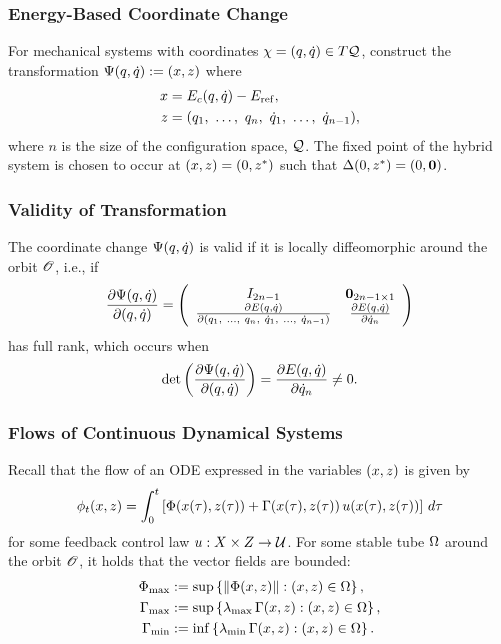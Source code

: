 \begin{frame}
  \frametitle{Energy-Based Coordinate Change}
  For mechanical systems with coordinates $\chi = (q, \dot q) \in T\mathcal{Q}$, construct the transformation $\Psi(q, \dot q) := (x, z)$ where
  \begin{align*}
    x &= E_{c}(q, \dot q) - E_{\mathrm{ref}},\\
    z &= (q_{1}, \ \ldots, \ q_{n}, \ \dot q_{1}, \ \ldots, \ \dot q_{n-1}),
  \end{align*}
  where $n$ is the size of the configuration space, $\mathcal{Q}$. The fixed point of the
  hybrid system is chosen to occur at $(x, z) = (0, z^{*})$ such that $\Delta(0, z^{*}) =
  (0, {\mathbf 0})$.
\end{frame}

\begin{frame}
  \frametitle{Validity of Transformation}
  The coordinate change $\Psi(q, \dot q)$ is valid if it is locally diffeomorphic around the orbit
  $\mathscr O$, i.e., if
  \begin{align}
    \frac{\partial{\Psi(\ensuremath{q}, \ensuremath{\dot q})}}{\partial{(\ensuremath{q}, \ensuremath{\dot q})}} =
    \left(\begin{array}{c c}
        I_{2n-1} & {\mathbf 0}_{2n-1 \times 1}\\
        \frac{\partial{E(\ensuremath{q}, \ensuremath{\dot q})}}{\partial{(\ensuremath{q}_{1}, \ \ldots, \ q_{n}, \ \ensuremath{\dot q}_{1}, \ \ldots, \ \ensuremath{\dot q}_{n-1})}} & \frac{\partial{E(\ensuremath{q}, \ensuremath{\dot q})}}{\partial{\ensuremath{\dot q}_{n}}}
      \end{array}\right)
  \end{align}
  has full rank, which occurs when
  \begin{align*}
    \det\left(\frac{\partial{\Psi(\ensuremath{q}, \ensuremath{\dot q})}}{\partial{(\ensuremath{q}, \ensuremath{\dot q})}}\right) = \frac{\partial{E(\ensuremath{q}, \ensuremath{\dot q})}}{\partial{\ensuremath{\dot q}_{n}}} \ne 0.
  \end{align*}
\end{frame}

\begin{frame}
  \frametitle{Flows of Continuous Dynamical Systems}
  Recall that the flow of an ODE expressed in the variables $(x, z)$ is given
  by
  \begin{align*}
    \phi_{t}(x, z) = \int_{0}^{t} \left[ \Phi(x(\tau), z(\tau)) + \Gamma(x(\tau), z(\tau)) \,
      u(x(\tau), z(\tau)) \right] \, d\tau
  \end{align*}
  for some feedback control law $u : X \times Z \to \mathcal{U}$. For some stable
  tube $\Omega$ around the orbit $\mathscr O$, it holds that the vector fields are bounded:
  \begin{align*}
    \Phi_{\max} & := \sup \left\{ \left\| \Phi(x, z) \right\| : (x, z) \in
      \Omega \right\},\\
    \Gamma_{\max} &:= \sup \left\{\operatorname*{\lambda_{\max}}\Gamma(x, z) : (x, z) \in \Omega
    \right\},\\
    \Gamma_{\min} &:= \inf \left\{\operatorname*{\lambda_{\min}}\Gamma(x, z) : (x, z) \in \Omega
    \right\}.
  \end{align*}
\end{frame}


